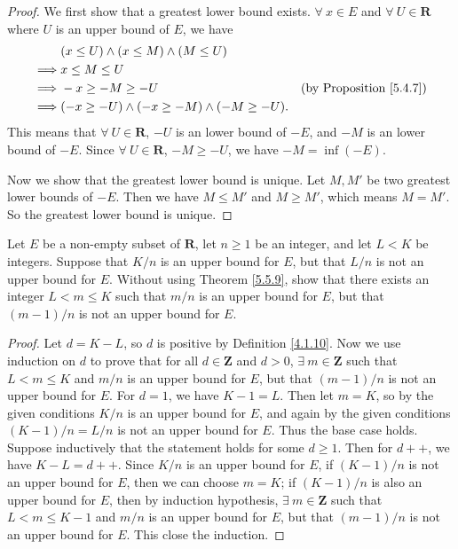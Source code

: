 \begin{proof}
    We first show that a greatest lower bound exists.
    \(\forall\ x \in E\) and \(\forall\ U \in \mathbf{R}\) where \(U\) is an upper bound of \(E\), we have
    \begin{align*}
                 & (x \leq U) \land (x \leq M) \land (M \leq U)                                              \\
        \implies & x \leq M \leq U                                                                           \\
        \implies & -x \geq -M \geq -U                                  & \text{(by Proposition \ref{5.4.7})} \\
        \implies & (-x \geq -U) \land (-x \geq -M) \land (-M \geq -U).
    \end{align*}
    This means that \(\forall\ U \in \mathbf{R}\), \(-U\) is an lower bound of \(-E\), and \(-M\) is an lower bound of \(-E\).
    Since \(\forall\ U \in \mathbf{R}\), \(-M \geq -U\), we have \(-M = \inf(-E)\).

    Now we show that the greatest lower bound is unique.
    Let \(M, M'\) be two greatest lower bounds of \(-E\).
    Then we have \(M \leq M'\) and \(M \geq M'\), which means \(M = M'\).
    So the greatest lower bound is unique.
\end{proof}

\begin{exercise}\label{ex 5.5.2}
    Let \(E\) be a non-empty subset of \(\mathbf{R}\), let \(n \geq 1\) be an integer, and let \(L < K\) be integers.
    Suppose that \(K / n\) is an upper bound for \(E\), but that \(L / n\) is not an upper bound for \(E\).
    Without using Theorem \ref{5.5.9}, show that there exists an integer \(L < m \leq K\) such that \(m / n\) is an upper bound for \(E\), but that \((m - 1) / n\) is not an upper bound for \(E\).
\end{exercise}

\begin{proof}
    Let \(d = K - L\), so \(d\) is positive by Definition \ref{4.1.10}.
    Now we use induction on \(d\) to prove that for all \(d \in \mathbf{Z}\) and \(d > 0\), \(\exists\ m \in \mathbf{Z}\) such that \(L < m \leq K\) and \(m / n\) is an upper bound for \(E\), but that \((m - 1) / n\) is not an upper bound for \(E\).
    For \(d = 1\), we have \(K - 1 = L\).
    Then let \(m = K\), so by the given conditions \(K / n\) is an upper bound for \(E\), and again by the given conditions \((K - 1) / n = L / n\) is not an upper bound for \(E\).
    Thus the base case holds.
    Suppose inductively that the statement holds for some \(d \geq 1\).
    Then for \(d++\), we have \(K - L = d++\).
    Since \(K / n\) is an upper bound for \(E\), if \((K - 1) / n\) is not an upper bound for \(E\), then we can choose \(m = K\);
    if \((K - 1) / n\) is also an upper bound for \(E\), then by induction hypothesis, \(\exists\ m \in \mathbf{Z}\) such that \(L < m \leq K - 1\) and \(m / n\) is an upper bound for \(E\), but that \((m - 1) / n\) is not an upper bound for \(E\).
    This close the induction.
\end{proof}

